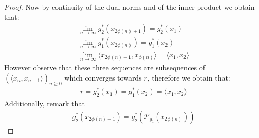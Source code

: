 \begin{proof}
Now by continuity of the dual norms and of the inner product we obtain that:
\begin{align*}
    \lim_{n\to\infty} g_2^{*}(x_{2\phi(n)+1})=g_2^{*}(x_1)\\
    \lim_{n\to\infty} g_1^{*}(x_{2\phi(n)})=g_1^{*}(x_2)\\
    \lim_{n\to\infty}\langle x_{2\phi(n)+1}, x_{\phi(n)}\rangle = \langle x_1, x_2\rangle 
\end{align*}
However observe that these three sequences are subsequences of $(\langle x_n,x_{n+1}\rangle)_{n\geq 0}$ which converges towards $r$, therefore we obtain that:
\begin{align*}
    r = g_2^{*}(x_1) = g_1^{*}(x_2) = \langle x_1, x_2\rangle 
\end{align*}
Additionally, remark that 
\begin{align}
\label{eq-proof=1}
g_2^{*}(x_{2\phi(n)+1})=g_2^*(\mathcal{P}_{g_1}(x_{2\phi(n)}))
\end{align}


\end{proof}

